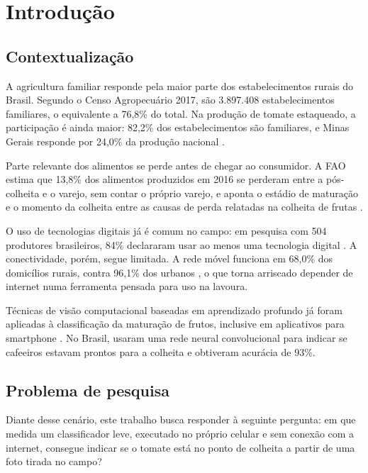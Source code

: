 \chapter{Introdução}\label{cap:introducao}


\section{Contextualização}

A agricultura familiar responde pela maior parte dos estabelecimentos rurais do Brasil. Segundo o Censo Agropecuário 2017, são 3.897.408 estabelecimentos familiares, o equivalente a 76,8\% do total. Na produção de tomate estaqueado, a participação é ainda maior: 82,2\% dos estabelecimentos são familiares, e Minas Gerais responde por 24,0\% da produção nacional \cite{ibge2019censo}.

Parte relevante dos alimentos se perde antes de chegar ao consumidor. A FAO estima que 13,8\% dos alimentos produzidos em 2016 se perderam entre a pós-colheita e o varejo, sem contar o próprio varejo, e aponta o estádio de maturação e o momento da colheita entre as causas de perda relatadas na colheita de frutas \cite{fao2019}.

O uso de tecnologias digitais já é comum no campo: em pesquisa com 504 produtores brasileiros, 84\% declararam usar ao menos uma tecnologia digital \cite{bolfe2020}. A conectividade, porém, segue limitada. A rede móvel funciona em 68,0\% dos domicílios rurais, contra 96,1\% dos urbanos \cite{ibge2026pnadtic}, o que torna arriscado depender de internet numa ferramenta pensada para uso na lavoura.

Técnicas de visão computacional baseadas em aprendizado profundo já foram aplicadas à classificação da maturação de frutos, inclusive em aplicativos para smartphone \cite{rizzo2023,mohamedon2021}. No Brasil,  usaram uma rede neural convolucional para indicar se cafeeiros estavam prontos para a colheita e obtiveram acurácia de 93\%.

\section{Problema de pesquisa}

Diante desse cenário, este trabalho busca responder à seguinte pergunta: em que medida um classificador leve, executado no próprio celular e sem conexão com a internet, consegue indicar se o tomate está no ponto de colheita a partir de uma foto tirada no campo?


